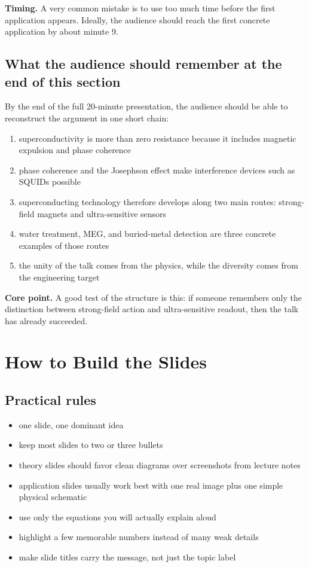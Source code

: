\documentclass[11pt,a4paper]{article}
\newcommand{\timing}[1]{%
  {\color{accent}\textbf{Timing.}} #1
}
\newcommand{\keypoint}[1]{%
  {\color{accent}\textbf{Core point.}} #1
}
\begin{document}
\timing{A very common mistake is to use too much time before the first application appears. Ideally, the audience should reach the first concrete application by about minute 9.}

\subsection{What the audience should remember at the end of this section}

By the end of the full 20-minute presentation, the audience should be able to reconstruct the argument in one short chain:
\begin{enumerate}
  \item superconductivity is more than zero resistance because it includes magnetic expulsion and phase coherence
  \item phase coherence and the Josephson effect make interference devices such as SQUIDs possible
  \item superconducting technology therefore develops along two main routes: strong-field magnets and ultra-sensitive sensors
  \item water treatment, MEG, and buried-metal detection are three concrete examples of those routes
  \item the unity of the talk comes from the physics, while the diversity comes from the engineering target
\end{enumerate}

\keypoint{A good test of the structure is this: if someone remembers only the distinction between strong-field action and ultra-sensitive readout, then the talk has already succeeded.}

\section{How to Build the Slides}

\subsection{Practical rules}

\begin{itemize}
  \item one slide, one dominant idea
  \item keep most slides to two or three bullets
  \item theory slides should favor clean diagrams over screenshots from lecture notes
  \item application slides usually work best with one real image plus one simple physical schematic
  \item use only the equations you will actually explain aloud
  \item highlight a few memorable numbers instead of many weak details
  \item make slide titles carry the message, not just the topic label
\end{itemize}
\end{document}
